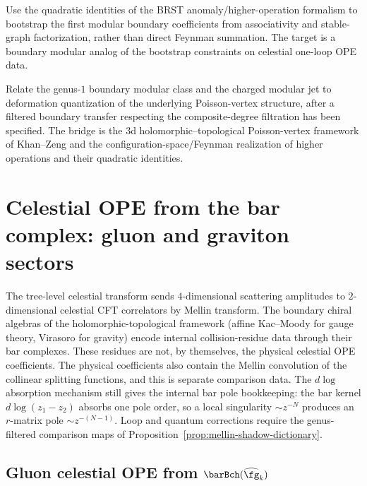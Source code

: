 \begin{problem}
\label{prob:modular-bootstrap}
Use the quadratic identities of the BRST anomaly/higher-operation formalism to bootstrap the
first modular boundary coefficients from associativity and stable-graph factorization,
rather than direct Feynman summation. The target is a boundary modular analog of
the bootstrap constraints on celestial one-loop OPE data.
\end{problem}

\begin{problem}
\label{prob:quantization-boundary-modular-class}
Relate the genus-$1$ boundary modular class and the charged modular jet to deformation
quantization of the underlying Poisson-vertex structure, after a filtered boundary
transfer respecting the composite-degree filtration has been specified. The bridge is the
$3$d holomorphic--topological Poisson-vertex framework of Khan--Zeng and the
configuration-space/Feynman realization of higher operations and their quadratic identities.
\end{problem}


\section{Celestial OPE from the bar complex: gluon and graviton sectors}
\label{sec:celestial-ope-bar-complex}

The tree-level celestial transform sends $4$-dimensional scattering amplitudes to
$2$-dimensional celestial CFT correlators by Mellin transform. The boundary chiral algebras
of the holomorphic-topological framework (affine Kac--Moody for gauge theory, Virasoro for
gravity) encode internal collision-residue data through their bar complexes. These residues
are not, by themselves, the physical celestial OPE coefficients. The physical coefficients
also contain the Mellin convolution of the collinear splitting functions, and this is
separate comparison data. The $d\log$ absorption mechanism still gives the internal bar
pole bookkeeping: the bar kernel $d\log(z_1 - z_2)$ absorbs one pole order, so a local
singularity $\sim z^{-N}$ produces an $r$-matrix pole $\sim z^{-(N-1)}$. Loop and quantum
corrections require the genus-filtered comparison maps of
Proposition~\ref{prop:mellin-shadow-dictionary}.

\subsection{Gluon celestial OPE from $\barBch(\widehat{\fg}_k)$}
\label{subsec:ch-core-gluon-celestial-ope}

